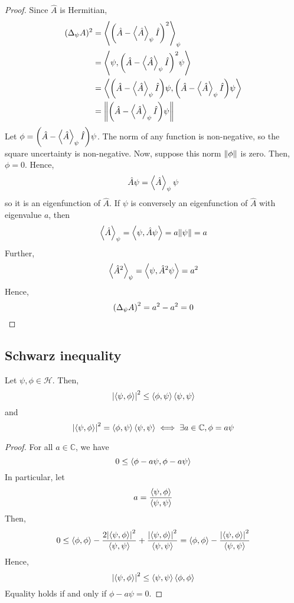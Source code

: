 \begin{proof}
	Since \( \hat A \) is Hermitian,
	\begin{align*}
		(\Delta_\psi A)^2 & = \left\langle{\qty(\hat A - \left\langle{\hat A}\right\rangle_\psi \hat I)^2}\right\rangle_\psi                                              \\
		                  & = \left\langle{\psi, \qty(\hat A - \left\langle{\hat A}\right\rangle_\psi \hat I)^2 \psi}\right\rangle                                        \\
		                  & = \left\langle{\qty(\hat A - \left\langle{\hat A}\right\rangle_\psi \hat I)\psi, \qty(\hat A - \left\langle{\hat A}\right\rangle_\psi \hat I) \psi}\right\rangle \\
		                  & = \norm{\qty(\hat A - \left\langle{\hat A}\right\rangle_\psi \hat I)\psi}
	\end{align*}
	Let \( \phi = \qty(\hat A - \left\langle{\hat A}\right\rangle_\psi \hat I)\psi \).
	The norm of any function is non-negative, so the square uncertainty is non-negative.
	Now, suppose this norm \( \norm{\phi} \) is zero.
	Then, \( \phi = 0 \).
	Hence,
	\[
		\hat A \psi = \left\langle{\hat A}\right\rangle_\psi \psi
	\]
	so it is an eigenfunction of \( \hat A \).
	If \( \psi \) is conversely an eigenfunction of \( \hat A \) with eigenvalue \( a \), then
	\[
		\left\langle{\hat A}\right\rangle_\psi = \left\langle{\psi, \hat A \psi}\right\rangle = a \norm{\psi} = a
	\]
	Further,
	\[
		\left\langle{\hat A^2}\right\rangle_\psi = \left\langle{\psi, \hat A^2 \psi}\right\rangle = a^2
	\]
	Hence,
	\[
		\qty(\Delta_\psi A)^2 = a^2 - a^2 = 0
	\]
\end{proof}

\subsection{Schwarz inequality}
\begin{theorem}
	Let \( \psi, \phi \in \mathcal H \).
	Then,
	\[
		\abs{\left\langle{\psi, \phi}\right\rangle}^2 \leq \left\langle{\phi, \psi}\right\rangle \left\langle{\psi, \psi}\right\rangle
	\]
	and
	\[
		\abs{\left\langle{\psi, \phi}\right\rangle}^2 = \left\langle{\phi, \psi}\right\rangle \left\langle{\psi, \psi}\right\rangle \iff \exists a \in \mathbb C, \phi = a \psi
	\]
\end{theorem}
\begin{proof}
	For all \( a \in \mathbb C \), we have
	\[
		0 \leq \left\langle{\phi - a \psi, \phi - a \psi}\right\rangle
	\]
	In particular, let
	\[
		a = \frac{\left\langle{\psi, \phi}\right\rangle}{\left\langle{\psi, \psi}\right\rangle}
	\]
	Then,
	\[
		0 \leq \left\langle{\phi, \phi}\right\rangle - \frac{2 \abs{\left\langle{\psi, \phi}\right\rangle}^2}{\left\langle{\psi, \psi}\right\rangle} + \frac{\abs{\left\langle{\psi, \phi}\right\rangle}^2}{\left\langle{\psi, \psi}\right\rangle} = \left\langle{\phi, \phi}\right\rangle - \frac{\abs{\left\langle{\psi, \phi}\right\rangle}^2}{\left\langle{\psi, \psi}\right\rangle}
	\]
	Hence,
	\[
		\abs{\left\langle{\psi, \phi}\right\rangle}^2 \leq \left\langle{\psi, \psi}\right\rangle \left\langle{\phi, \phi}\right\rangle
	\]
	Equality holds if and only if \( \phi - a \psi = 0 \).
\end{proof}


